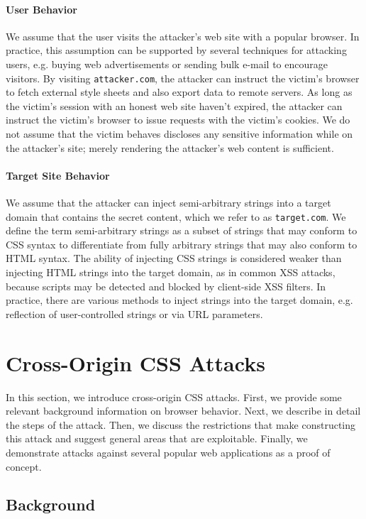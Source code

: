 \documentclass{acm_proc_article-sp}
\begin{document}
\paragraph{User Behavior}
We assume that the user visits the attacker's web site with a popular browser. In practice, this assumption can be supported by several techniques for attacking users, e.g. buying web advertisements or sending bulk e-mail to encourage visitors. By visiting \texttt{attacker.com}, the attacker can instruct the victim's browser to fetch external style sheets and also export data to remote servers. As long as the victim's session with an honest web site haven't expired, the attacker can instruct the victim's browser to issue requests with the victim's cookies.
We do not assume that the victim behaves discloses any sensitive information
while on the attacker's site; merely rendering the attacker's web content
is sufficient.

\paragraph{Target Site Behavior}
We assume that the attacker can inject semi-arbitrary strings into a target domain that contains the secret content, which we refer to as \texttt{target.com}. We define the term semi-arbitrary strings as a subset of strings that may conform to CSS syntax to differentiate from fully arbitrary strings that may also conform to HTML syntax. The ability of injecting CSS strings is considered weaker than injecting HTML strings into the target domain, as in common XSS attacks, because scripts may be detected and blocked by client-side XSS filters. In practice, there are various methods to inject strings into the target domain, e.g. reflection of user-controlled strings or via URL parameters.

\section{Cross-Origin CSS Attacks} \label{sec:attacks}
In this section, we introduce cross-origin CSS attacks. First, we provide some
relevant background information on browser behavior. Next, we describe in
detail the steps of the attack. Then, we discuss the restrictions that make
constructing this attack and suggest general areas that are exploitable.
Finally, we demonstrate attacks against several popular web applications as a proof of concept.

\subsection{Background}
\end{document}
